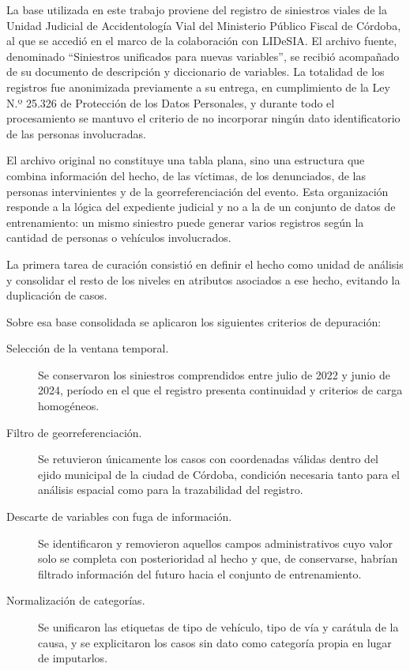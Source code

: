 La base utilizada en este trabajo proviene del registro de siniestros viales de la Unidad Judicial de Accidentología Vial del Ministerio Público Fiscal de Córdoba, al que se accedió en el marco de la colaboración con LIDeSIA. El archivo fuente, denominado \enquote{Siniestros unificados para nuevas variables}, se recibió acompañado de su documento de descripción y diccionario de variables. La totalidad de los registros fue anonimizada previamente a su entrega, en cumplimiento de la Ley N.º 25.326 de Protección de los Datos Personales, y durante todo el procesamiento se mantuvo el criterio de no incorporar ningún dato identificatorio de las personas involucradas.

El archivo original no constituye una tabla plana, sino una estructura que combina información del hecho, de las víctimas, de los denunciados, de las personas intervinientes y de la georreferenciación del evento. Esta organización responde a la lógica del expediente judicial y no a la de un conjunto de datos de entrenamiento: un mismo siniestro puede generar varios registros según la cantidad de personas o vehículos involucrados.

La primera tarea de curación consistió en definir el hecho como unidad de análisis y consolidar el resto de los niveles en atributos asociados a ese hecho, evitando la duplicación de casos.

Sobre esa base consolidada se aplicaron los siguientes criterios de depuración:

\begin{description}
  \item[Selección de la ventana temporal.] Se conservaron los siniestros comprendidos entre julio de 2022 y junio de 2024, período en el que el registro presenta continuidad y criterios de carga homogéneos.
  \item[Filtro de georreferenciación.] Se retuvieron únicamente los casos con coordenadas válidas dentro del ejido municipal de la ciudad de Córdoba, condición necesaria tanto para el análisis espacial como para la trazabilidad del registro.
  \item[Descarte de variables con fuga de información.] Se identificaron y removieron aquellos campos administrativos cuyo valor solo se completa con posterioridad al hecho y que, de conservarse, habrían filtrado información del futuro hacia el conjunto de entrenamiento.
  \item[Normalización de categorías.] Se unificaron las etiquetas de tipo de vehículo, tipo de vía y carátula de la causa, y se explicitaron los casos sin dato como categoría propia en lugar de imputarlos.
\end{description}


